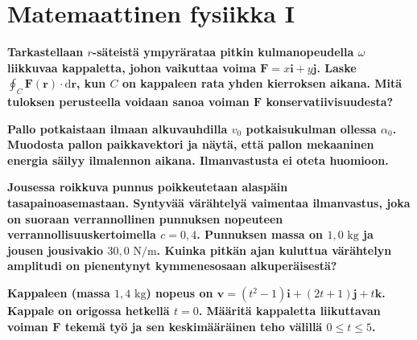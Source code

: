 \documentclass[12pt,finnish]{exam}
\begin{document}
 \section*{Matemaattinen fysiikka I}
 
\vspace{5mm}
 
\begin{questions}
\bfseries
\question
\mdseries
Tarkastellaan \(r\)-säteistä ympyrärataa pitkin kulmanopeudella \(\omega\) liikkuvaa kappaletta, johon vaikuttaa voima \(\mathbf{F}=x\mathbf{i}+y\mathbf{j}\). Laske \(\displaystyle \oint_C \mathbf{F}(\mathbf{r})\cdot \text{d}\mathbf{r}\), kun \(C\) on kappaleen rata yhden kierroksen aikana. Mitä tuloksen perusteella voidaan sanoa voiman \(\mathbf{F}\) konservatiivisuudesta?

\bfseries
\question
\mdseries
Pallo potkaistaan ilmaan alkuvauhdilla \(v_0\) potkaisukulman ollessa \(\alpha _0\). Muodosta pallon paikkavektori ja näytä, että pallon mekaaninen energia säilyy ilmalennon aikana. Ilmanvastusta ei oteta huomioon.

\bfseries
\question
\mdseries
Jousessa roikkuva punnus poikkeutetaan alaspäin tasapainoasemastaan. Syntyvää värähtelyä vaimentaa ilmanvastus, joka on suoraan verrannollinen punnuksen nopeuteen verrannollisuuskertoimella \(c=0,\! 4\). Punnuksen massa on \(1,\! 0\text{ kg}\) ja jousen jousivakio \(30,\! 0\text{ N/m}\). Kuinka pitkän ajan kuluttua värähtelyn amplitudi on pienentynyt kymmenesosaan alkuperäisestä?

\bfseries
\question
\mdseries
Kappaleen (massa \(1,\!4\text{ kg}\)) nopeus on \(\mathbf{v}=(t^2-1)\mathbf{i}+(2t+1)\mathbf{j}+t\mathbf{k}\). Kappale on origossa hetkellä \(t=0\). Määritä kappaletta liikuttavan voiman \(\mathbf{F}\) tekemä työ ja sen keskimääräinen teho välillä \(0\leq t\leq 5\).
\end{questions}

\thispagestyle{empty}
\end{document}
